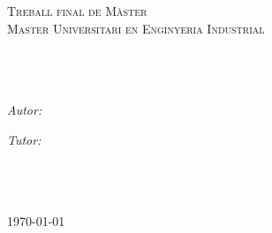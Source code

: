 \documentclass[11pt, twoside,a4paper]{Thesis} %
\begin{document}
\begin{titlepage}
	\begin{center}
		
		
		\textsc{\Large Treball final de Màster}\\[0.5cm] %
		\textsc{\Large Master Universitari en Enginyeria Industrial}\\[0.5cm]
		\HRule \\[0.4cm] %
		{\huge \bfseries \ttitle}\\[0.4cm] %
		\HRule \\[1.5cm] %
		
		\begin{minipage}{0.4\textwidth}
			\begin{flushleft} \large
				\emph{Autor:}\\
				{\authornames} %
			\end{flushleft}
		\end{minipage}
		\begin{minipage}{0.4\textwidth}
			\begin{flushright} \large
				\emph{Tutor:} \\
				{\supname} %
			\end{flushright}
		\end{minipage}\\[3cm]
		
		
		
		\groupname\\\deptname\\[2cm] %
		
		{\large \today}\\[4cm] %
		
		\vfill
	\end{center}
	
\end{titlepage}




\end{document}
